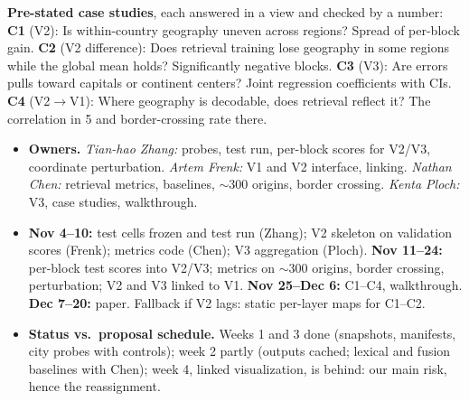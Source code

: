 \documentclass[10pt]{article}
\newcommand{\head}[1]{\par\vspace{3pt}{\large\bfseries #1}\par\vspace{1pt}}
\begin{document}
\head{Case studies and plan}
\textbf{Pre-stated case studies}, each answered in a view and checked by a number: \textbf{C1} (V2): Is within-country geography uneven across regions? Spread of per-block gain. \textbf{C2} (V2 difference): Does retrieval training lose geography in some regions while the global mean holds? Significantly negative blocks. \textbf{C3} (V3): Are errors pulls toward capitals or continent centers? Joint regression coefficients with CIs. \textbf{C4} (V2$\to$V1): Where geography is decodable, does retrieval reflect it? The correlation in 5 and border-crossing rate there.
\begin{itemize}
\item \textbf{Owners.} \emph{Tian-hao Zhang:} probes, test run, per-block scores for V2/V3, coordinate perturbation. \emph{Artem Frenk:} V1 and V2 interface, linking. \emph{Nathan Chen:} retrieval metrics, baselines, $\sim$300 origins, border crossing. \emph{Kenta Ploch:} V3, case studies, walkthrough.
\item \textbf{Nov 4--10:} test cells frozen and test run (Zhang); V2 skeleton on validation scores (Frenk); metrics code (Chen); V3 aggregation (Ploch). \textbf{Nov 11--24:} per-block test scores into V2/V3; metrics on $\sim$300 origins, border crossing, perturbation; V2 and V3 linked to V1. \textbf{Nov 25--Dec 6:} C1--C4, walkthrough. \textbf{Dec 7--20:} paper. Fallback if V2 lags: static per-layer maps for C1--C2.
\item \textbf{Status vs.\ proposal schedule.} Weeks 1 and 3 done (snapshots, manifests, city probes with controls); week 2 partly (outputs cached; lexical and fusion baselines with Chen); week 4, linked visualization, is behind: our main risk, hence the reassignment.
\end{itemize}
\end{document}
